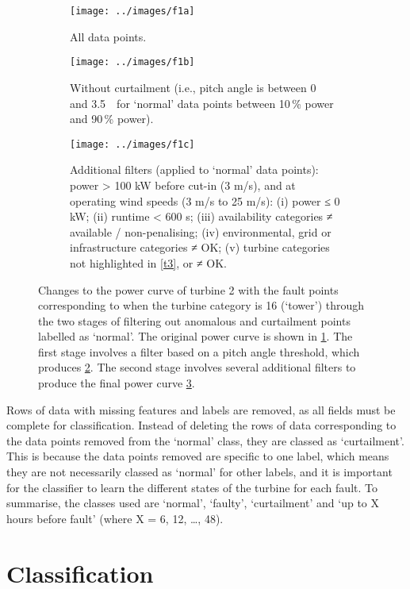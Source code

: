 \begin{figure}
  \centering
  \begin{subfigure}[t]{.5\textwidth}
    \centering
    \texttt{[image: ../images/f1a]}
    \caption{\label{f1a}All data points.}
  \end{subfigure}%
  \begin{subfigure}[t]{.5\textwidth}
    \centering
    \texttt{[image: ../images/f1b]}
    \caption{\label{f1b}Without curtailment (i.e., pitch angle is between 0\,\textdegree~ and 3.5\,\textdegree~ for `normal' data points between 10\,\% power and 90\,\% power).}
  \end{subfigure}
  \begin{subfigure}[t]{.5\textwidth}
    \centering
    \texttt{[image: ../images/f1c]}
    \caption{\label{f1c}
      Additional filters (applied to `normal' data points): power > 100 kW before cut-in (3 m/s), and at operating wind speeds (3 m/s to 25 m/s): (i) power ≤ 0 kW; (ii) runtime < 600 s; (iii) availability categories ≠ available / non-penalising; (iv) environmental, grid or infrastructure categories ≠ OK; (v) turbine categories not highlighted in \autoref{t3}, or ≠ OK.
    }
  \end{subfigure}
  \caption{\label{f1}Changes to the power curve of turbine 2 with the fault points corresponding to when the turbine category is 16 (`tower') through the two stages of filtering out anomalous and curtailment points labelled as `normal'. The original power curve is shown in \ref{f1a}. The first stage involves a filter based on a pitch angle threshold, which produces \ref{f1b}. The second stage involves several additional filters to produce the final power curve \ref{f1c}.}
\end{figure}

Rows of data with missing features and labels are removed, as all fields must be complete for classification. Instead of deleting the rows of data corresponding to the data points removed from the `normal' class, they are classed as `curtailment'. This is because the data points removed are specific to one label, which means they are not necessarily classed as `normal' for other labels, and it is important for the classifier to learn the different states of the turbine for each fault. To summarise, the classes used are `normal', `faulty', `curtailment' and `up to X hours before fault' (where X = 6, 12, \dots, 48). 

\section{Classification}

